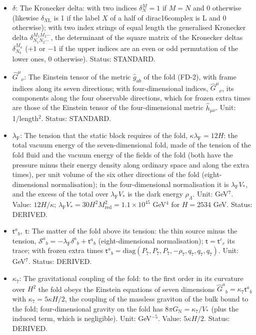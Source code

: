 \documentclass[
  10pt,
]{article}
\begin{document}
\begin{itemize}
\item
  \(\delta\): The Kronecker delta: with two indices \(\delta^M_N = 1\)
  if \(M = N\) and 0 otherwise (likewise \(\delta_{X\mathrm{L}}\) is 1
  if the label \(X\) of a half of dirac16complex is L and 0 otherwise);
  with two index strings of equal length the generalised Kronecker delta
  \(\delta^{M_1M_2\cdots}_{N_1N_2\cdots}\), the determinant of the
  square matrix of the Kronecker deltas \(\delta^{M_a}_{N_b}\) (\(+1\)
  or \(-1\) if the upper indices are an even or odd permutation of the
  lower ones, 0 otherwise). Status: STANDARD.
\item
  \(\hat G^\mu{}_\nu\): The Einstein tensor of the metric
  \(\hat g_{ab}\) of the fold (FD-2), with frame indices along its seven
  directions; with four-dimensional indices, \(\hat G^\mu{}_\nu\), its
  components along the four observable directions, which for frozen
  extra times are those of the Einstein tensor of the four-dimensional
  metric \(\hat h_{\mu\nu}\). Unit: 1/length\(^2\). Status: STANDARD.
\item
  \(\lambda_{\mathrm{F}}\): The tension that the static block requires
  of the fold, \(\kappa\lambda_{\mathrm{F}} = 12H\): the total vacuum
  energy of the seven-dimensional fold, made of the tension of the fold
  fluid and the vacuum energy of the fields of the fold (both have the
  pressure minus their energy density along ordinary space and along the
  extra times), per unit volume of the six other directions of the fold
  (eight-dimensional normalisation); in the four-dimensional
  normalisation it is \(\lambda_{\mathrm{F}}V_*\), and the excess of the
  total over \(\lambda_{\mathrm{F}}V_*\) is the dark energy
  \(\rho_\Lambda\). Unit: GeV\(^7\). Value: \(12H/\kappa\);
  \(\lambda_{\mathrm{F}}V_* = 30H^2M_{\mathrm{red}}^2 = 1.1\times10^{45}\)
  GeV\(^4\) for \(H = 2534\) GeV. Status: DERIVED.
\item
  \(\mathsf{t}^a{}_b,\ \mathsf{t}\): The matter of the fold above its
  tension: the thin source minus the tension,
  \(\mathcal{S}^a{}_b = -\lambda_{\mathrm{F}}\delta^a{}_b + \mathsf{t}^a{}_b\)
  (eight-dimensional normalisation); \(\mathsf{t} = \mathsf{t}^c{}_c\)
  its trace; with frozen extra times
  \(\mathsf{t}^a{}_b = \mathrm{diag}(P_7, P_7, P_7, -\rho_7, q_7, q_7, q_7)\).
  Unit: GeV\(^7\). Status: DERIVED.
\item
  \(\kappa_7\): The gravitational coupling of the fold: to the first
  order in its curvature over \(H^2\) the fold obeys the Einstein
  equations of seven dimensions
  \(\hat G^a{}_b = \kappa_7\mathsf{t}^a{}_b\) with
  \(\kappa_7 = 5\kappa H/2\), the coupling of the massless graviton of
  the bulk bound to the fold; four-dimensional gravity on the fold has
  \(8\pi G_{\mathrm{N}} = \kappa_7/V_*\) (plus the induced term, which
  is negligible). Unit: GeV\(^{-5}\). Value: \(5\kappa H/2\). Status:
  DERIVED.
\end{itemize}
\end{document}
